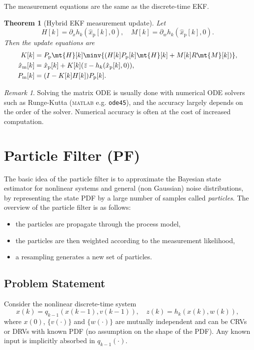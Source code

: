 \documentclass[]{hsrzf}
\theoremstyle{plain}
\newtheorem{thm}{Theorem}[section]
\theoremstyle{definition}
\theoremstyle{remark}
\newtheorem*{remark}{Remark}
\begin{document}
The measurement equations are the same as the discrete-time EKF.

\begin{thm}[Hybrid EKF measurement update]
  Let
  \[
    H[k] = \partial_x h_k(\hat{x}_\mathrm{p}[k], 0),
    \quad
    M[k] = \partial_w h_k(\hat{x}_\mathrm{p}[k], 0).
  \]
  Then the update equations are
  \begin{align*}
    K[k] &= P_\mathrm{p} \mt{H}[k]\minv{(
      H[k] P_\mathrm{p}[k] \mt{H}[k] + M[k] R \mt{M}[k])}, \\
    \hat{x}_\mathrm{m}[k] &= \hat{x}_\mathrm{p}[k]
      + K[k](\bar{z} - h_k(\hat{x}_\mathrm{p}[k], 0)), \\
    P_\mathrm{m}[k] &= (I - K[k] H[k]) P_\mathrm{p}[k].
  \end{align*}
\end{thm}

\begin{remark}
  Solving the matrix ODE is usually done with numerical ODE solvers such as
  Runge-Kutta (\textsc{matlab} e.g. \texttt{ode45}), and the accuracy largely
  depends on the order of the solver. Numerical accuracy is often at the cost
  of increased computation.
\end{remark}

\section{Particle Filter (PF)}

The basic idea of the particle filter is to approximate the Bayesian state
estimator for nonlinear systems and general (non Gaussian) noise
distributions, by representing the state PDF by a large number of samples
called \emph{particles}. The overview of the particle filter is as follows:
\begin{itemize}
  \item the particles are propagate through the process model,
  \item the particles are then weighted according to the measurement
    likelihood,
  \item a resampling generates a new set of particles.
\end{itemize}

\subsection{Problem Statement}

Consider the nonlinear discrete-time system
\[
  x(k) = q_{k-1}(x(k-1), v(k-1)),
  \quad
  z(k) = h_k(x(k), w(k)),
\]
where $x(0)$, $\{v(\cdot)\}$ and $\{w(\cdot)\}$ are mutually independent and
can be CRVs or DRVs with known PDF (no assumption on the shape of the PDF).
Any known input is implicitly absorbed in $q_{k-1}(\cdot)$.
\end{document}
